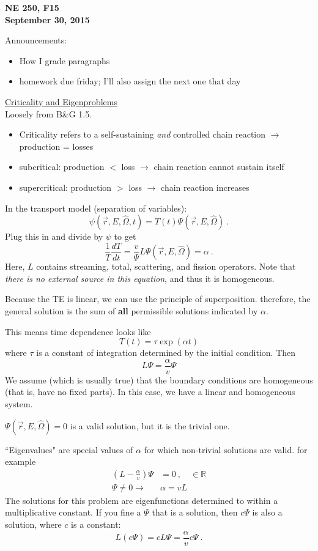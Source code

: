 \documentclass[12pt]{article}
\newcommand{\rvec}{\ensuremath{\vec{r}}}
\newcommand{\vOmega}{\ensuremath{\hat{\Omega}}}
\begin{document}
\begin{center}
{\bf NE 250, F15\\
September 30, 2015 
}
\end{center}

Announcements:
\begin{itemize}
\item How I grade paragraphs
\item homework due friday; I'll also assign the next one that day
\end{itemize}


\underline{Criticality and Eigenproblems}\\
Loosely from B\&G 1.5.
\begin{itemize}
\item Criticality refers to a self-sustaining \textit{and} controlled chain reaction $\rightarrow$ production = losses
\item subcritical: production $<$ loss $\rightarrow$ chain reaction cannot sustain itself
\item supercritical: production $>$ loss $\rightarrow$ chain reaction increases 
\end{itemize}
%
In the transport model (separation of variables):
\[\psi(\rvec, E, \vOmega, t) = T(t) \Psi(\rvec, E, \vOmega) \:.\]
Plug this in and divide by $\psi$ to get
\[\frac{1}{T}\frac{dT}{dt} = \frac{v}{\Psi} L \Psi(\rvec, E, \vOmega) = \alpha \:.\]
%
Here, $L$ contains streaming, total, scattering, and fission operators. Note that \textit{there is no external source in this equation}, and thus it is homogeneous.

Because the TE is linear, we can use the principle of superposition. 
therefore, the general solution is the sum of \textbf{all} permissible solutions indicated by $\alpha$.

This means time dependence looks like
\[ T(t) = \tau \exp(\alpha t)\]
where $\tau$ is a constant of integration determined by the initial condition.
Then
\[L\Psi = \frac{\alpha}{v}\Psi\]
%
We assume (which is usually true) that the boundary conditions are homogeneous (that is, have no fixed parts).
In this case, we have a linear and homogeneous system.

$\Psi(\rvec, E, \vOmega) = 0$ is a valid solution, but it is the trivial one.

``Eigenvalues" are special values of $\alpha$ for which non-trivial solutions are valid.
for example
\begin{align*}
(L - \frac{\alpha}{v})\Psi &= 0 \:, \quad \in \mathbb{R} \\
\Psi \neq 0 \rightarrow \: &\alpha = v L
\end{align*}
%
The solutions for this problem are eigenfunctions determined to within a multiplicative constant.
If you fine a $\Psi$ that is a solution, then $c \Psi$ is also a solution, where $c$ is a constant:
\[L(c \Psi) = cL \Psi = \frac{\alpha}{v}c \Psi \:.\]
\end{document}
